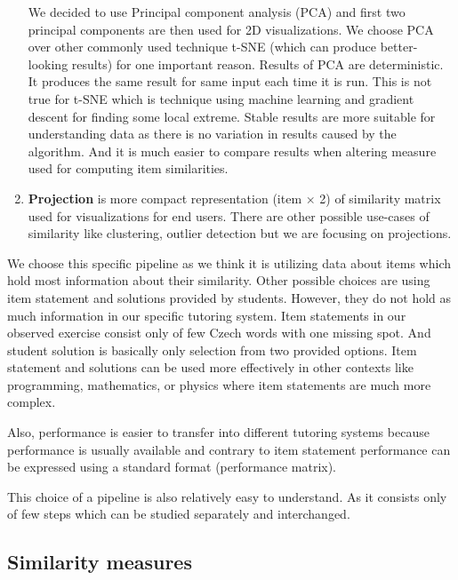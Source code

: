 \documentclass[
  digital, %
  table,   %
  nolof,     %
  nolot,     %
  nocover,
  color,
  final, %
]{fithesis3}
\begin{document}
\begin{enumerate}

    We decided to use Principal component analysis (PCA) and first two principal components are then used for 2D visualizations. We choose PCA over other commonly used technique t-SNE (which can produce better-looking results) for one important reason. Results of PCA are deterministic. It produces the same result for same input each time it is run. This is not true for t-SNE which is technique using machine learning and gradient descent for finding some local extreme. Stable results are more suitable for understanding data as there is no variation in results caused by the algorithm. And it is much easier to compare results when altering measure used for computing item similarities.

  \item
    \textbf{Projection} is more compact representation (item $\times$ 2) of similarity matrix used for visualizations for end users. There are other possible use-cases of similarity like clustering, outlier detection but we are focusing on projections.
\end{enumerate}


We choose this specific pipeline as we think it is utilizing data about items which hold most information about their similarity. Other possible choices are using item statement and solutions provided by students. However, they do not hold as much information in our specific tutoring system. Item statements in our observed exercise consist only of few Czech words with one missing spot. And student solution is basically only selection from two provided options. Item statement and solutions can be used more effectively in other contexts like programming, mathematics, or physics where item statements are much more complex.

Also, performance is easier to transfer into different tutoring systems because performance is usually available and contrary to item statement performance can be expressed using a standard format (performance matrix).

This choice of a pipeline is also relatively easy to understand. As it consists only of few steps which can be studied separately and interchanged.


\subsection{Similarity measures}\label{similarity-measures}
\end{document}
